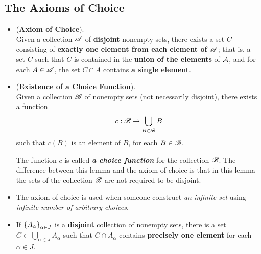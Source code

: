 \documentclass[11pt]{article}
\begin{document}
\subsection{The Axioms of Choice}
\begin{itemize}
\item \begin{principle} (\textbf{Axiom of Choice}). \citep{munkres2000topology} \\
Given a collection ${\mathscr A}$ of \textbf{disjoint} nonempty sets, there exists a set $C$ consisting of \textbf{exactly one element from each element of ${\mathscr A}$}; that is, a set $C$ such that $C$ is contained in the \textbf{union of the elements} of ${\mathcal A}$, and for each $A \in {\mathscr A}$, the set $C \cap A$ contains \textbf{a single element}.
\end{principle}

\item \begin{lemma} (\textbf{Existence of a Choice Function}). \citep{munkres2000topology}\\
Given a collection ${\mathscr B}$ of nonempty sets (not necessarily disjoint), there exists a function
\begin{align*}
c: {\mathscr B} \rightarrow \bigcup_{B \in {\mathscr B}}B
\end{align*}
such that $c(B)$ is an element of $B$, for each $B \in {\mathscr B}$.
\end{lemma} 

\begin{remark}
The function $c$ is called \emph{\textbf{a choice function}} for the collection ${\mathscr B}$.
The difference between this lemma and the axiom of choice is that in this lemma the sets of the collection ${\mathscr B}$ are not required to be disjoint.
\end{remark}

\item \begin{remark}
The axiom of choice is used when someone construct \emph{an infinite set} using \emph{infinite number of arbitrary choices}.
\end{remark}



\item \begin{corollary}
If $\left\{A_{\alpha}\right\}_{\alpha \in J}$ is a \textbf{disjoint} collection of nonempty sets, there is a set $C \subset \bigcup_{\alpha \in J}A_{\alpha}$ such that $C \cap A_{\alpha}$ contains \textbf{precisely one element} for each $\alpha \in J$.
\end{corollary}
\end{itemize}
\end{document}
